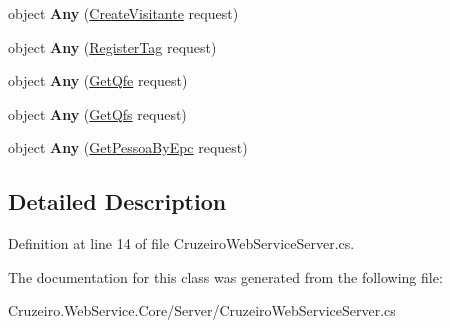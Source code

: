 \begin{DoxyCompactItemize}
\item 
object {\bfseries Any} (\hyperlink{class_cruzeiro_1_1_web_service_1_1_core_1_1_d_t_o_1_1_create_visitante}{Create\+Visitante} request)\hypertarget{class_cruzeiro_1_1_web_service_1_1_core_1_1_server_1_1_cruzeiro_web_service_server_a49cdc4a578ea54806c52b207b0ba3cde}{}\label{class_cruzeiro_1_1_web_service_1_1_core_1_1_server_1_1_cruzeiro_web_service_server_a49cdc4a578ea54806c52b207b0ba3cde}

\item 
object {\bfseries Any} (\hyperlink{class_cruzeiro_1_1_web_service_1_1_core_1_1_d_t_o_1_1_register_tag}{Register\+Tag} request)\hypertarget{class_cruzeiro_1_1_web_service_1_1_core_1_1_server_1_1_cruzeiro_web_service_server_a63f8bfc347c543270e7af385c7e58990}{}\label{class_cruzeiro_1_1_web_service_1_1_core_1_1_server_1_1_cruzeiro_web_service_server_a63f8bfc347c543270e7af385c7e58990}

\item 
object {\bfseries Any} (\hyperlink{class_cruzeiro_1_1_web_service_1_1_core_1_1_d_t_o_1_1_get_qfe}{Get\+Qfe} request)\hypertarget{class_cruzeiro_1_1_web_service_1_1_core_1_1_server_1_1_cruzeiro_web_service_server_ac28dc9bbf2e387bb58edc2bf012d2297}{}\label{class_cruzeiro_1_1_web_service_1_1_core_1_1_server_1_1_cruzeiro_web_service_server_ac28dc9bbf2e387bb58edc2bf012d2297}

\item 
object {\bfseries Any} (\hyperlink{class_cruzeiro_1_1_web_service_1_1_core_1_1_d_t_o_1_1_get_qfs}{Get\+Qfs} request)\hypertarget{class_cruzeiro_1_1_web_service_1_1_core_1_1_server_1_1_cruzeiro_web_service_server_a27f06947b125ea6a24887dcc18e17fc3}{}\label{class_cruzeiro_1_1_web_service_1_1_core_1_1_server_1_1_cruzeiro_web_service_server_a27f06947b125ea6a24887dcc18e17fc3}

\item 
object {\bfseries Any} (\hyperlink{class_cruzeiro_1_1_web_service_1_1_core_1_1_d_t_o_1_1_get_pessoa_by_epc}{Get\+Pessoa\+By\+Epc} request)\hypertarget{class_cruzeiro_1_1_web_service_1_1_core_1_1_server_1_1_cruzeiro_web_service_server_a8df222fde74ff2f20002111c929b1745}{}\label{class_cruzeiro_1_1_web_service_1_1_core_1_1_server_1_1_cruzeiro_web_service_server_a8df222fde74ff2f20002111c929b1745}

\end{DoxyCompactItemize}


\subsection{Detailed Description}


Definition at line 14 of file Cruzeiro\+Web\+Service\+Server.\+cs.



The documentation for this class was generated from the following file\+:\begin{DoxyCompactItemize}
\item 
Cruzeiro.\+Web\+Service.\+Core/\+Server/Cruzeiro\+Web\+Service\+Server.\+cs\end{DoxyCompactItemize}
